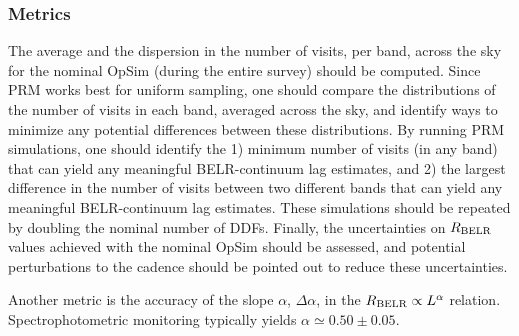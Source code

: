 
\subsubsection{Metrics}
\label{sec:\secname:metrics}

The average and the dispersion in the number of visits, per band, across
the sky for the nominal OpSim (during the entire survey) should be computed.
Since PRM works best for uniform sampling, one should compare the distributions
of the number of visits in each band, averaged across the sky, and identify
ways to minimize any potential differences between these distributions. By
running PRM simulations, one should identify the 1) minimum number of visits
(in any band) that can yield any meaningful BELR-continuum lag estimates, and
2) the largest difference in the number of visits between two different bands
that can yield any meaningful BELR-continuum lag estimates. These simulations
should be repeated by doubling the nominal number of DDFs. Finally, the
uncertainties on $R_{\rm BELR}$ values achieved with the nominal OpSim
should be assessed, and potential perturbations to the cadence should be
pointed out to reduce these uncertainties.

Another metric is the accuracy of the slope $\alpha$, $\Delta \alpha$, in the
$R_{\rm BELR} \propto L^{\alpha}$ relation. Spectrophotometric monitoring
typically yields $\alpha \simeq 0.50 \pm 0.05$.

%
%
%
%
%
%
%
%

\navigationbar
